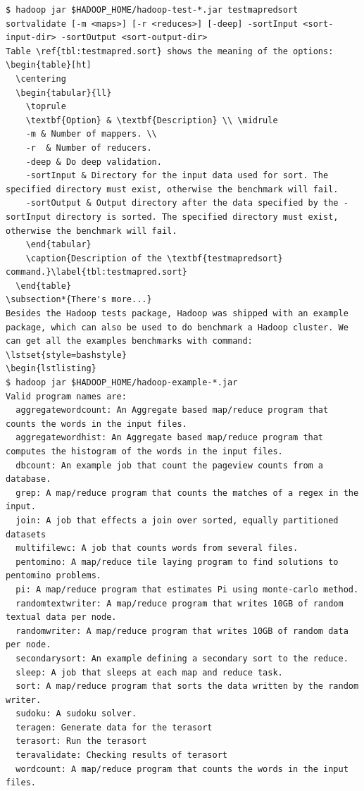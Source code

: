 \begin{lstlisting}
$ hadoop jar $HADOOP_HOME/hadoop-test-*.jar testmapredsort
sortvalidate [-m <maps>] [-r <reduces>] [-deep] -sortInput <sort-input-dir> -sortOutput <sort-output-dir>
Table \ref{tbl:testmapred.sort} shows the meaning of the options:
\begin{table}[ht]
  \centering
  \begin{tabular}{ll}
    \toprule
    \textbf{Option} & \textbf{Description} \\ \midrule
    -m & Number of mappers. \\ 
    -r  & Number of reducers.
    -deep & Do deep validation.
    -sortInput & Directory for the input data used for sort. The specified directory must exist, otherwise the benchmark will fail.
    -sortOutput & Output directory after the data specified by the -sortInput directory is sorted. The specified directory must exist, otherwise the benchmark will fail.
    \end{tabular}
    \caption{Description of the \textbf{testmapredsort} command.}\label{tbl:testmapred.sort}
  \end{table}
\subsection*{There's more...}
Besides the Hadoop tests package, Hadoop was shipped with an example package, which can also be used to do benchmark a Hadoop cluster. We can get all the examples benchmarks with command:
\lstset{style=bashstyle}
\begin{lstlisting}
$ hadoop jar $HADOOP_HOME/hadoop-example-*.jar
Valid program names are:
  aggregatewordcount: An Aggregate based map/reduce program that counts the words in the input files.
  aggregatewordhist: An Aggregate based map/reduce program that computes the histogram of the words in the input files.
  dbcount: An example job that count the pageview counts from a database.
  grep: A map/reduce program that counts the matches of a regex in the input.
  join: A job that effects a join over sorted, equally partitioned datasets
  multifilewc: A job that counts words from several files.
  pentomino: A map/reduce tile laying program to find solutions to pentomino problems.
  pi: A map/reduce program that estimates Pi using monte-carlo method.
  randomtextwriter: A map/reduce program that writes 10GB of random textual data per node.
  randomwriter: A map/reduce program that writes 10GB of random data per node.
  secondarysort: An example defining a secondary sort to the reduce.
  sleep: A job that sleeps at each map and reduce task.
  sort: A map/reduce program that sorts the data written by the random writer.
  sudoku: A sudoku solver.
  teragen: Generate data for the terasort
  terasort: Run the terasort
  teravalidate: Checking results of terasort
  wordcount: A map/reduce program that counts the words in the input files.
\end{lstlisting}

